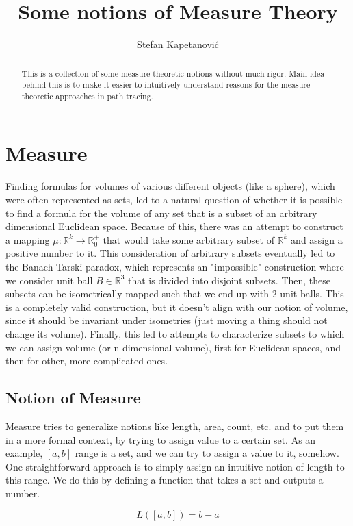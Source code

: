 \documentclass{article}
\title{Some notions of Measure Theory}
\author{Stefan Kapetanović}
\begin{document}
\maketitle

\begin{abstract}
This is a collection of some measure theoretic notions without much rigor. Main idea behind this is to make it easier to intuitively understand reasons for the measure theoretic approaches in path tracing.
\end{abstract}

\section{Measure}
Finding formulas for volumes of various different objects (like a sphere), which were often represented as sets, led to a natural question of whether it is possible to find a formula for the volume of any set that is a subset of an arbitrary dimensional Euclidean space. Because of this, there was an attempt to construct a mapping $\mu:\mathbb{R}^k\to\mathbb{R}_{0}^{+}$ that would take some arbitrary subset of $\mathbb{R}^k$ and assign a positive number to it. This consideration of arbitrary subsets eventually led to the Banach-Tarski paradox, which represents an "impossible" construction where we consider unit ball $B\in\mathbb{R}^3$ that is divided into disjoint subsets. Then, these subsets can be isometrically mapped such that we end up with 2 unit balls. This is a completely valid construction, but it doesn't align with our notion of volume, since it should be invariant under isometries (just moving a thing should not change its volume). Finally, this led to attempts to characterize subsets to which we can assign volume (or n-dimensional volume), first for Euclidean spaces, and then for other, more complicated ones.

\subsection{Notion of Measure}
Measure tries to generalize notions like length, area, count, etc. and to put them in a more formal context, by trying to assign value to a certain set. As an example, $[a, b]$ range is a set, and we can try to assign a value to it, somehow. One straightforward approach is to simply assign an intuitive notion of length to this range. We do this by defining a function that takes a set and outputs a number.

\[ L([a, b]) = b - a \]
\end{document}
